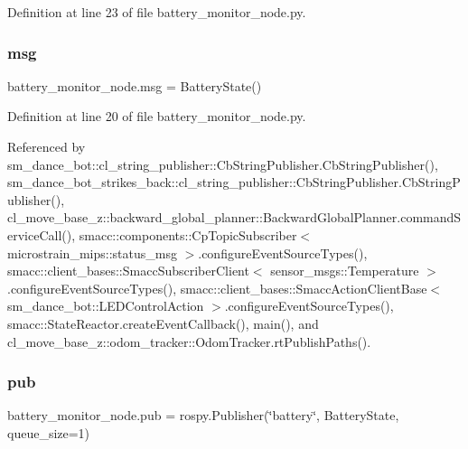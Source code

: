 Definition at line 23 of file battery\+\_\+monitor\+\_\+node.\+py.

\mbox{\label{namespacebattery__monitor__node_ab1920c64448816edd4064e494275fdff}} 
\subsubsection{\texorpdfstring{msg}{msg}}
{\footnotesize\ttfamily battery\+\_\+monitor\+\_\+node.\+msg = Battery\+State()}



Definition at line 20 of file battery\+\_\+monitor\+\_\+node.\+py.



Referenced by sm\+\_\+dance\+\_\+bot\+::cl\+\_\+string\+\_\+publisher\+::\+Cb\+String\+Publisher.\+Cb\+String\+Publisher(), sm\+\_\+dance\+\_\+bot\+\_\+strikes\+\_\+back\+::cl\+\_\+string\+\_\+publisher\+::\+Cb\+String\+Publisher.\+Cb\+String\+Publisher(), cl\+\_\+move\+\_\+base\+\_\+z\+::backward\+\_\+global\+\_\+planner\+::\+Backward\+Global\+Planner.\+command\+Service\+Call(), smacc\+::components\+::\+Cp\+Topic\+Subscriber$<$ microstrain\+\_\+mips\+::status\+\_\+msg $>$.\+configure\+Event\+Source\+Types(), smacc\+::client\+\_\+bases\+::\+Smacc\+Subscriber\+Client$<$ sensor\+\_\+msgs\+::\+Temperature $>$.\+configure\+Event\+Source\+Types(), smacc\+::client\+\_\+bases\+::\+Smacc\+Action\+Client\+Base$<$ sm\+\_\+dance\+\_\+bot\+::\+L\+E\+D\+Control\+Action $>$.\+configure\+Event\+Source\+Types(), smacc\+::\+State\+Reactor.\+create\+Event\+Callback(), main(), and cl\+\_\+move\+\_\+base\+\_\+z\+::odom\+\_\+tracker\+::\+Odom\+Tracker.\+rt\+Publish\+Paths().

\mbox{\label{namespacebattery__monitor__node_ab13957b56951b692f19d70ccac2e2511}} 
\subsubsection{\texorpdfstring{pub}{pub}}
{\footnotesize\ttfamily battery\+\_\+monitor\+\_\+node.\+pub = rospy.\+Publisher(\char`\"{}battery\char`\"{}, Battery\+State, queue\+\_\+size=1)}



